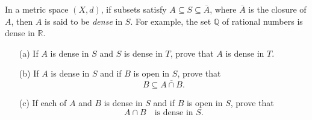 \begin{problem}[21 pts]
    In a metric space $(X,d)$, if subsets satisfy $A \subseteq S \subseteq \overline{A}$, where $\overline{A}$ is the closure of $A$, then $A$ is said to be \emph{dense} in $S$. 
For example, the set $\mathbb{Q}$ of rational numbers is dense in $\mathbb{R}$. 

\begin{enumerate}
  \item[(a)] If $A$ is dense in $S$ and $S$ is dense in $T$, prove that $A$ is dense in $T$.
  
  \item[(b)]  If $A$ is dense in $S$ and if $B$ is open in $S$, prove that
\[
B \subseteq \overline{A \cap B}.
\]
  \item[(c)]  If each of $A$ and $B$ is dense in $S$ and if $B$ is open in $S$, prove that
\[
A \cap B \quad \text{is dense in } S.
\]
\end{enumerate}

\end{problem}